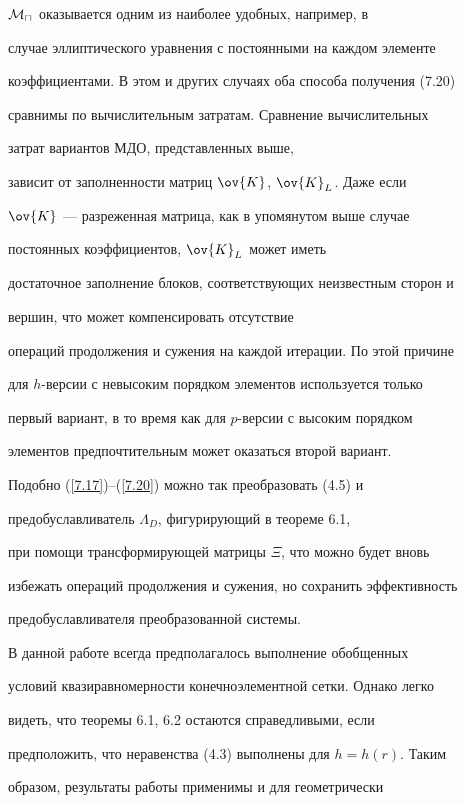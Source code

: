 ${\cal M}_{\sqcap}$ оказывается одним из наиболее удобных, например, в 


случае эллиптического уравнения с постоянными на каждом элементе 


коэффициентами. В этом и других случаях оба способа получения (7.20) 


сравнимы по вычислительным затратам. Сравнение вычислительных 


затрат вариантов МДО, представленных выше, 


зависит от заполненности матриц $\ov{K}$, $\ov{K}_L$. Даже если 


$\ov{K}$ --- разреженная матрица, как в упомянутом выше случае 


постоянных коэффициентов, $\ov{K}_L$ может иметь 


достаточное заполнение блоков, соответствующих неизвестным сторон и 


вершин, что может компенсировать отсутствие 


операций продолжения и сужения на каждой итерации. По этой причине 


для $h$-версии с невысоким порядком элементов используется только 


первый вариант, в то время как для $p$-версии с высоким порядком 


элементов предпочтительным может оказаться второй вариант. 





Подобно (\ref{7.17})--(\ref{7.20}) можно так преобразовать (4.5) и 


предобуславливатель $\Lambda_D$, фигурирующий в теореме 6.1,


при помощи трансформирующей матрицы $\Xi$, что можно будет вновь 


избежать операций продолжения и сужения, но сохранить эффективность


предобуславливателя преобразованной системы. 





В данной работе всегда предполагалось выполнение обобщенных 


условий квазиравномерности конечноэлементной сетки. Однако легко 


видеть, что теоремы 6.1, 6.2 остаются справедливыми, если 


предположить, что неравенства (4.3) выполнены для $h=h(r)$. Таким 


образом, результаты работы применимы и для геометрически 


